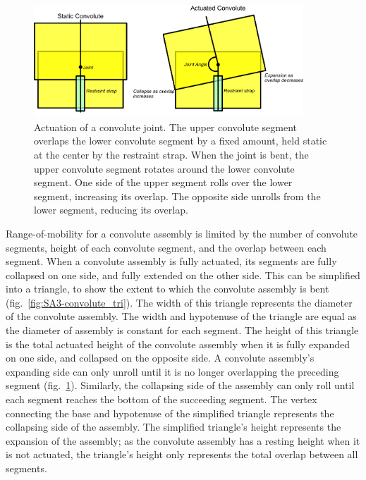 \documentclass[defaultstyle,11pt]{thesis}
\begin{document}
\hypertarget{fig:SA3-convolute_actuation}{%
\begin{figure}
\centering
\includegraphics[width=0.9\textwidth,height=\textheight]{../fig/SA3/Convolute_Actuation.png}
\caption[{Actuation of a convolute joint}]{Actuation of a convolute joint. The upper convolute segment overlaps the lower convolute segment by a fixed amount, held static at the center by the restraint strap. When the joint is bent, the upper convolute segment rotates around the lower convolute segment. One side of the upper segment rolls over the lower segment, increasing its overlap. The opposite side unrolls from the lower segment, reducing its overlap.}
\label{fig:SA3-convolute_actuation}
\end{figure}
}

Range-of-mobility for a convolute assembly is limited by the number of convolute segments, height of each convolute segment, and the overlap between each segment.
When a convolute assembly is fully actuated, its segments are fully collapsed on one side, and fully extended on the other side.
This can be simplified into a triangle, to show the extent to which the convolute assembly is bent (fig.~\ref{fig:SA3-convolute_tri}).
The width of this triangle represents the diameter of the convolute assembly.
The width and hypotenuse of the triangle are equal as the diameter of assembly is constant for each segment.
The height of this triangle is the total actuated height of the convolute assembly when it is fully expanded on one side, and collapsed on the opposite side.
A convolute assembly's expanding side can only unroll until it is no longer overlapping the preceding segment (fig.~\ref{fig:SA3-convolute_actuation}).
Similarly, the collapsing side of the assembly can only roll until each segment reaches the bottom of the succeeding segment.
The vertex connecting the base and hypotenuse of the simplified triangle represents the collapsing side of the assembly.
The simplified triangle's height represents the expansion of the assembly; as the convolute assembly has a resting height when it is not actuated, the triangle's height only represents the total overlap between all segments.
\end{document}

